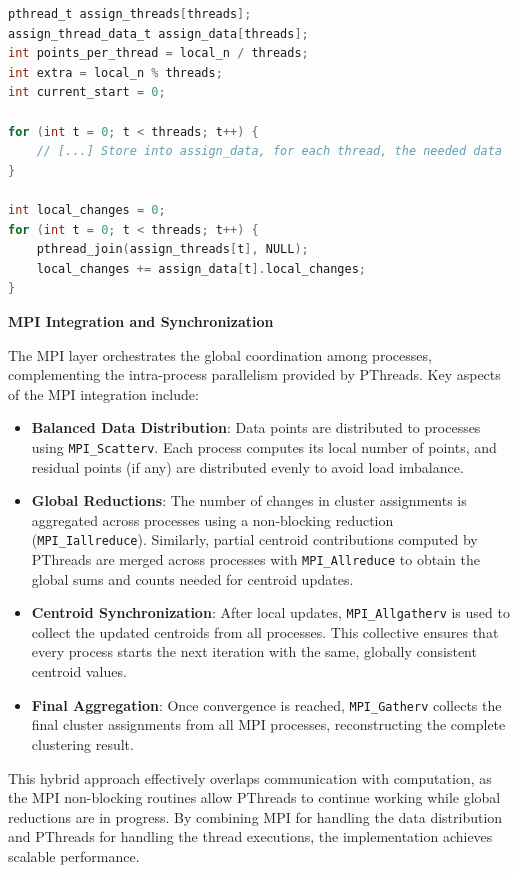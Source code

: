 \documentclass[11pt, journal]{IEEEtran}
\begin{document}
\begin{lstlisting}[language = C]
pthread_t assign_threads[threads];
assign_thread_data_t assign_data[threads];
int points_per_thread = local_n / threads;
int extra = local_n % threads;
int current_start = 0;

for (int t = 0; t < threads; t++) {
    // [...] Store into assign_data, for each thread, the needed data
}

int local_changes = 0;
for (int t = 0; t < threads; t++) {
    pthread_join(assign_threads[t], NULL);
    local_changes += assign_data[t].local_changes;
}
\end{lstlisting}

\noindent \textbf{MPI Integration and Synchronization}

The MPI layer orchestrates the global coordination among processes, complementing the intra-process parallelism provided by PThreads. Key aspects of the MPI integration include:

\begin{itemize}
    \item \textbf{Balanced Data Distribution}: Data points are distributed to processes using \texttt{MPI\_Scatterv}. Each process computes its local number of points, and residual points (if any) are distributed evenly to avoid load imbalance.
    
    \item \textbf{Global Reductions}: The number of changes in cluster assignments is aggregated across processes using a non-blocking reduction (\texttt{MPI\_Iallreduce}). Similarly, partial centroid contributions computed by PThreads are merged across processes with \texttt{MPI\_Allreduce} to obtain the global sums and counts needed for centroid updates.
    
    \item \textbf{Centroid Synchronization}: After local updates, \texttt{MPI\_Allgatherv} is used to collect the updated centroids from all processes. This collective ensures that every process starts the next iteration with the same, globally consistent centroid values.
    
    \item \textbf{Final Aggregation}: Once convergence is reached, \texttt{MPI\_Gatherv} collects the final cluster assignments from all MPI processes, reconstructing the complete clustering result.
\end{itemize}

This hybrid approach effectively overlaps communication with computation, as the MPI non-blocking routines allow PThreads to continue working while global reductions are in progress. By combining MPI for handling the data distribution and PThreads for handling the thread executions, the implementation achieves scalable performance. %
\end{document}
